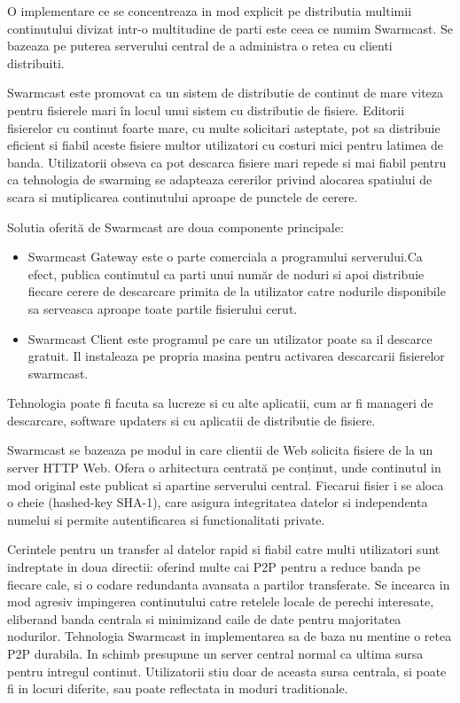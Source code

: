 O implementare ce se concentreaza in mod explicit pe distributia multimii
continutului divizat intr-o multitudine de parti este ceea ce numim Swarmcast.
Se bazeaza pe puterea serverului central de a administra o retea cu clienti
distribuiti.

Swarmcast este promovat ca un sistem de distributie de continut de mare viteza
pentru fisierele mari în locul unui sistem cu distributie de fisiere. Editorii
fisierelor cu continut foarte mare, cu multe solicitari asteptate, pot sa
distribuie eficient si fiabil aceste fisiere multor utilizatori cu costuri
mici pentru latimea de banda. Utilizatorii obseva ca pot descarca fisiere mari
repede si mai fiabil pentru ca tehnologia de swarming se adapteaza cererilor
privind alocarea spatiului de scara si mutiplicarea continutului aproape de
punctele de cerere.

Solutia oferită de Swarmcast are doua componente principale:

\begin{itemize}
  \item{Swarmcast Gateway este o parte comerciala a programului serverului.Ca
  efect, publica continutul ca parti unui număr de noduri si apoi distribuie
  fiecare cerere de descarcare primita de la utilizator catre nodurile
  disponibile sa serveasca aproape toate partile fisierului cerut.}
  \item{Swarmcast Client este programul pe care un utilizator poate sa il
  descarce gratuit. Il instaleaza pe propria masina pentru activarea
  descarcarii fisierelor swarmcast.}
\end{itemize}

Tehnologia poate fi facuta sa lucreze si cu alte aplicatii, cum ar fi manageri
de descarcare, software updaters si cu aplicatii de distributie de fisiere.

Swarmcast se bazeaza pe modul in care clientii de Web solicita fisiere de la
un server HTTP Web. Ofera o arhitectura centrată pe conținut, unde continutul
in mod original este publicat si apartine serverului central. Fiecarui fisier
i se aloca o cheie (hashed-key SHA-1), care asigura integritatea datelor si
independenta numelui si permite autentificarea si functionalitati private. 

Cerintele pentru un transfer al datelor rapid si fiabil catre multi
utilizatori sunt indreptate in doua directii: oferind multe cai P2P pentru a
reduce banda pe fiecare cale, si o codare redundanta avansata a partilor
transferate. Se incearca in mod agresiv impingerea continutului catre retelele
locale de perechi interesate, eliberand banda centrala si minimizand caile de
date pentru majoritatea nodurilor. Tehnologia Swarmcast in implementarea sa de
baza nu mentine o retea P2P durabila. In schimb presupune un server central
normal ca ultima sursa pentru intregul continut. Utilizatorii stiu doar de
aceasta sursa centrala, si poate fi in locuri diferite, sau poate reflectata
in moduri traditionale.

